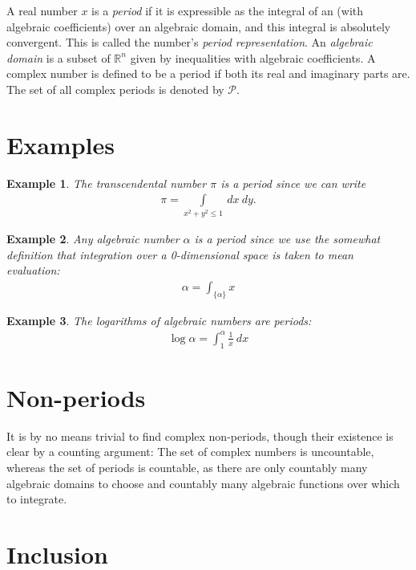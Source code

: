 \documentclass[12pt]{article}
\newtheorem{Exam}{Example}
\newcommand{\mc}{\mathcal}
\newcommand{\mb}{\mathbb}
\newcommand{\R}{\mb{R}}
\newcommand{\<}{\langle}
\renewcommand{\>}{\rangle}
\begin{document}
A real number $x$ is a \emph{period} if it is expressible as the integral of an  (with algebraic coefficients) over an algebraic domain, and this integral is absolutely convergent. This  is called the number's \emph{period representation}.  An \emph{algebraic domain} is a subset of $\R^n$ given by  inequalities with algebraic coefficients. A complex number is defined to be a period if both its real and imaginary parts are.  The set of all complex periods is denoted by $\mc{P}$.

\section{Examples}

\begin{Exam}
The transcendental number $\pi$ is a period since we can write 
\begin{align*}
\pi=\int\limits_{x^2+y^2\leq1}~dx~dy.
\end{align*}
\end{Exam}

\begin{Exam}
Any algebraic number $\alpha$ is a period since we use the somewhat  definition that integration over a 0-dimensional space is taken to mean evaluation:
\begin{align*}
\alpha=\int_{\{\alpha\}}x
\end{align*}
\end{Exam}

\begin{Exam}
The logarithms of algebraic numbers are periods:
\begin{align*}
\log\alpha=\int_1^\alpha\frac{1}{x}~dx
\end{align*}
\end{Exam}

\section{Non-periods}

It is by no means trivial to find complex non-periods, though their existence is clear by a counting argument:  The set of complex numbers is uncountable, whereas the set of periods is countable, as there are only countably many algebraic domains to choose and countably many algebraic functions over which to integrate.

\section{Inclusion}
\end{document}
